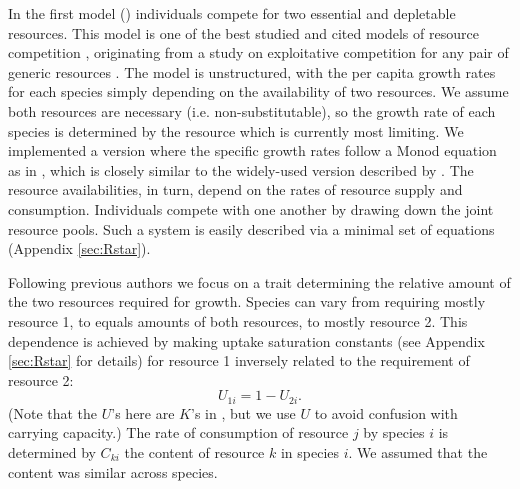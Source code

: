 \documentclass[a4paper,11pt]{article}
\begin{document}
In the first model (\Rstar) individuals compete for two essential and
depletable resources. This model is one of the best studied and cited
models of resource competition \citep{Tilman-1977, Tilman-1982,
  Huisman-2001}, originating from a study on exploitative competition
for any pair of generic resources \citep{Leon-1975}. The model is
unstructured, with the per capita growth rates for each species simply
depending on the availability of two resources.  We assume both
resources are necessary (i.e. non-substitutable), so the growth rate
of each species is determined by the resource which is currently most
limiting.  We implemented a version where the specific growth rates
follow a Monod equation as in \citet{Huisman-2001}, which is closely
similar to the widely-used version described by \citet{Tilman-1977,
  Tilman-1982}.  The resource availabilities, in turn, depend on the
rates of resource supply and consumption. Individuals compete with one
another by drawing down the joint resource pools. Such a system is
easily described via a minimal set of equations (Appendix
\ref{sec:Rstar}).

Following previous authors \citep{Tilman-1985, Schreiber-2003,
  Fox-2008} we focus on a trait determining the relative amount of the
two resources required for growth. Species can vary from requiring
mostly resource 1, to equals amounts of both resources, to mostly
resource 2. This dependence is achieved by making uptake saturation
constants (see Appendix \ref{sec:Rstar} for details) for resource 1
inversely related to the requirement of resource 2:
\begin{equation}
\label{eq:R3}
U_{1i} = 1 - U_{2i}.
\end{equation}
(Note that the $U$'s here are $K$'s in \citet{Huisman-2001}, but we
use $U$ to avoid confusion with carrying capacity.)
%
The rate of consumption of resource $j$ by species $i$ is determined by
$C_{ki}$ the content of resource $k$ in species $i$. We assumed that
the content was similar across species.

%
\end{document}
